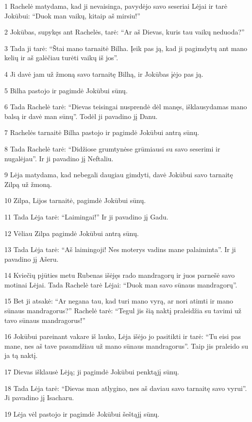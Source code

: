 \par 1 Rachelė matydama, kad ji nevaisinga, pavydėjo savo seseriai Lėjai ir tarė Jokūbui: “Duok man vaikų, kitaip aš mirsiu!” 
\par 2 Jokūbas, supykęs ant Rachelės, tarė: “Ar aš Dievas, kuris tau vaikų neduoda?” 
\par 3 Tada ji tarė: “Štai mano tarnaitė Bilha. Įeik pas ją, kad ji pagimdytų ant mano kelių ir aš galėčiau turėti vaikų iš jos”. 
\par 4 Ji davė jam už žmoną savo tarnaitę Bilhą, ir Jokūbas įėjo pas ją. 
\par 5 Bilha pastojo ir pagimdė Jokūbui sūnų. 
\par 6 Tada Rachelė tarė: “Dievas teisingai nusprendė dėl manęs, išklausydamas mano balsą ir davė man sūnų”. Todėl ji pavadino jį Danu. 
\par 7 Rachelės tarnaitė Bilha pastojo ir pagimdė Jokūbui antrą sūnų. 
\par 8 Tada Rachelė tarė: “Didžiose grumtynėse grūmiausi su savo seserimi ir nugalėjau”. Ir ji pavadino jį Neftaliu. 
\par 9 Lėja matydama, kad nebegali daugiau gimdyti, davė Jokūbui savo tarnaitę Zilpą už žmoną. 
\par 10 Zilpa, Lijos tarnaitė, pagimdė Jokūbui sūnų. 
\par 11 Tada Lėja tarė: “Laimingai!” Ir ji pavadino jį Gadu. 
\par 12 Vėliau Zilpa pagimdė Jokūbui antrą sūnų. 
\par 13 Tada Lėja tarė: “Aš laimingoji! Nes moterys vadins mane palaiminta”. Ir ji pavadino jį Ašeru. 
\par 14 Kviečių pjūties metu Rubenas išėjęs rado mandragorų ir juos parnešė savo motinai Lėjai. Tada Rachelė tarė Lėjai: “Duok man savo sūnaus mandragorų”. 
\par 15 Bet ji atsakė: “Ar negana tau, kad turi mano vyrą, ar nori atimti ir mano sūnaus mandragorus?” Rachelė tarė: “Tegul jis šią naktį praleidžia su tavimi už tavo sūnaus mandragorus!” 
\par 16 Jokūbui pareinant vakare iš lauko, Lėja išėjo jo pasitikti ir tarė: “Tu eisi pas mane, nes aš tave pasamdžiau už mano sūnaus mandragorus”. Taip jis praleido su ja tą naktį. 
\par 17 Dievas išklausė Lėją; ji pagimdė Jokūbui penktąjį sūnų. 
\par 18 Tada Lėja tarė: “Dievas man atlygino, nes aš daviau savo tarnaitę savo vyrui”. Ji pavadino jį Isacharu. 
\par 19 Lėja vėl pastojo ir pagimdė Jokūbui šeštąjį sūnų. 
